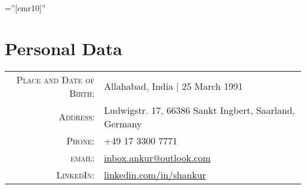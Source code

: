 \documentclass[a4paper,10pt]{article} %
\begin{document}
\pagestyle{empty} %

\font\fb=''[cmr10]'' %

\vspace{-2.5cm}
\par{\bigskip\par} %
\vspace{-0.3cm}
\section{Personal Data}
\vspace*{0.2cm}
\begin{tabular}{rl}
\textsc{Place and Date of Birth:} & Allahabad, India  | 25 March 1991 \\
\textsc{Address:} & Ludwigstr. 17, 66386 Sankt Ingbert, Saarland, Germany \\
\textsc{Phone:} & +49 17 3300 7771\\
\textsc{email:} & \href{mailto:inbox.ankur@outlook.com}{inbox.ankur@outlook.com}\\
\textsc{LinkedIn:}& \href{https://www.linkedin.com/in/shankur/}{linkedin.com/in/shankur}
\end{tabular}

\end{document}
